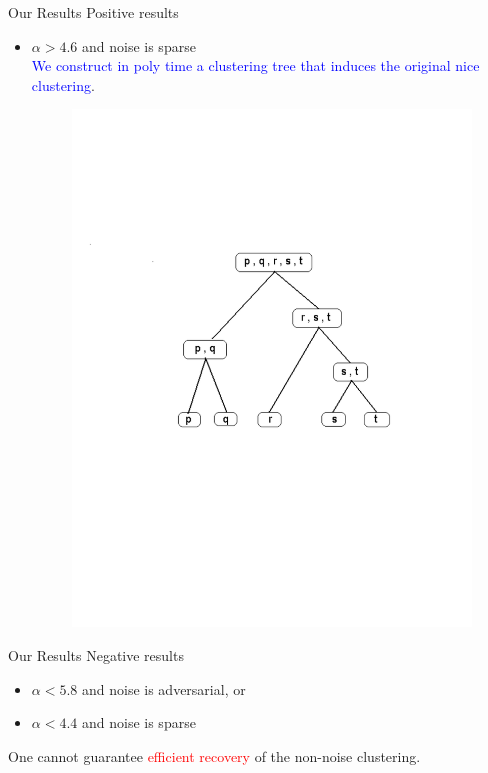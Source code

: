 \documentclass{beamer}
\begin{document}
\begin{frame}{Our Results}
 \alert{Positive results}
 \begin{itemize}
  	\item $\alpha > 4.6$ and noise is sparse\\ 	
	\textcolor{blue}{We construct  in poly time a clustering tree that induces the original nice clustering}.  	
	\begin{figure}
	  \includegraphics[trim = 50 150 50 200, clip, width=0.8\linewidth]{figures/hier.pdf}
	\end{figure}	  	
  \end{itemize}  
\end{frame}

\begin{frame}{Our Results}
	\alert{Negative results}
  	\begin{itemize}
	  	\vspace{0.5cm}\item $\alpha < 5.8$ and noise is adversarial, or 
		\vspace{0.5cm}\item $\alpha < 4.4$ and noise is sparse
	\end{itemize}
	 \vspace{1.0cm}One cannot guarantee \textcolor{red}{ efficient recovery} of the non-noise clustering. 
\end{frame}
\end{document}
